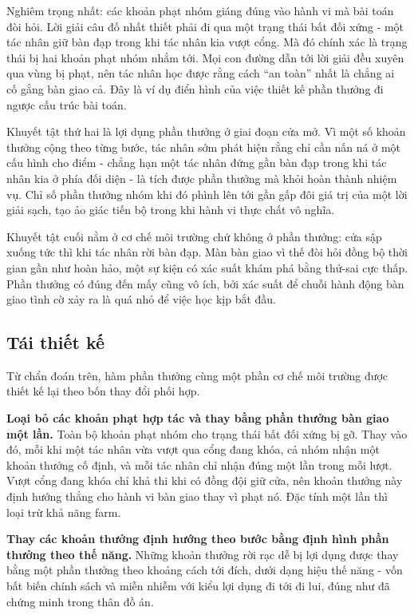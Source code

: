 \indent Nghiêm trọng nhất: các khoản phạt nhóm giáng đúng vào hành vi mà bài toán đòi hỏi.
Lời giải câu đố nhất thiết phải đi qua một trạng thái bất đối xứng - một tác nhân giữ bàn
đạp trong khi tác nhân kia vượt cổng. Mà đó chính xác là trạng thái bị hai khoản phạt nhóm
nhắm tới. Mọi con đường dẫn tới lời giải đều xuyên qua vùng bị phạt, nên tác nhân học được
rằng cách ``an toàn'' nhất là chẳng ai cố gắng bàn giao cả. Đây là ví dụ điển hình của
việc thiết kế phần thưởng đi ngược cấu trúc bài toán.

\indent Khuyết tật thứ hai là lợi dụng phần thưởng ở giai đoạn cửa mở. Vì một số khoản
thưởng cộng theo từng bước, tác nhân sớm phát hiện rằng chỉ cần nấn ná ở một cấu hình cho
điểm - chẳng hạn một tác nhân đứng gần bàn đạp trong khi tác nhân kia ở phía đối diện - là
tích được phần thưởng mà khỏi hoàn thành nhiệm vụ. Chỉ số phần thưởng nhóm khi đó phình
lên tới gần gấp đôi giá trị của một lời giải sạch, tạo ảo giác tiến bộ trong khi hành vi
thực chất vô nghĩa.

\indent Khuyết tật cuối nằm ở cơ chế môi trường chứ không ở phần thưởng: cửa sập xuống tức
thì khi tác nhân rời bàn đạp. Màn bàn giao vì thế đòi hỏi đồng bộ thời gian gần như hoàn
hảo, một sự kiện có xác suất khám phá bằng thử-sai cực thấp. Phần thưởng có đúng đến mấy
cũng vô ích, bởi xác suất để chuỗi hành động bàn giao tình cờ xảy ra là quá nhỏ để việc
học kịp bắt đầu.

\subsection{Tái thiết kế}
\indent Từ chẩn đoán trên, hàm phần thưởng cùng một phần cơ chế môi trường được thiết kế
lại theo bốn thay đổi phối hợp.

\indent \textbf{Loại bỏ các khoản phạt hợp tác và thay bằng phần thưởng bàn giao một
lần.} Toàn bộ khoản phạt nhóm cho trạng thái bất đối xứng bị gỡ. Thay vào đó, mỗi khi một
tác nhân vừa vượt qua cổng đang khóa, cả nhóm nhận một khoản thưởng cố định, và mỗi tác
nhân chỉ nhận đúng một lần trong mỗi lượt. Vượt cổng đang khóa chỉ khả thi khi có đồng đội
giữ cửa, nên khoản thưởng này định hướng thẳng cho hành vi bàn giao thay vì phạt nó. Đặc
tính một lần thì loại trừ khả năng farm.

\indent \textbf{Thay các khoản thưởng định hướng theo bước bằng định hình phần thưởng theo
thế năng.} Những khoản thưởng rời rạc dễ bị lợi dụng được thay bằng một phần thưởng theo
khoảng cách tới đích, dưới dạng hiệu thế năng - vốn bất biến chính sách và miễn nhiễm với
kiểu lợi dụng đi tới đi lui, đúng như đã chứng minh trong thân đồ án.

